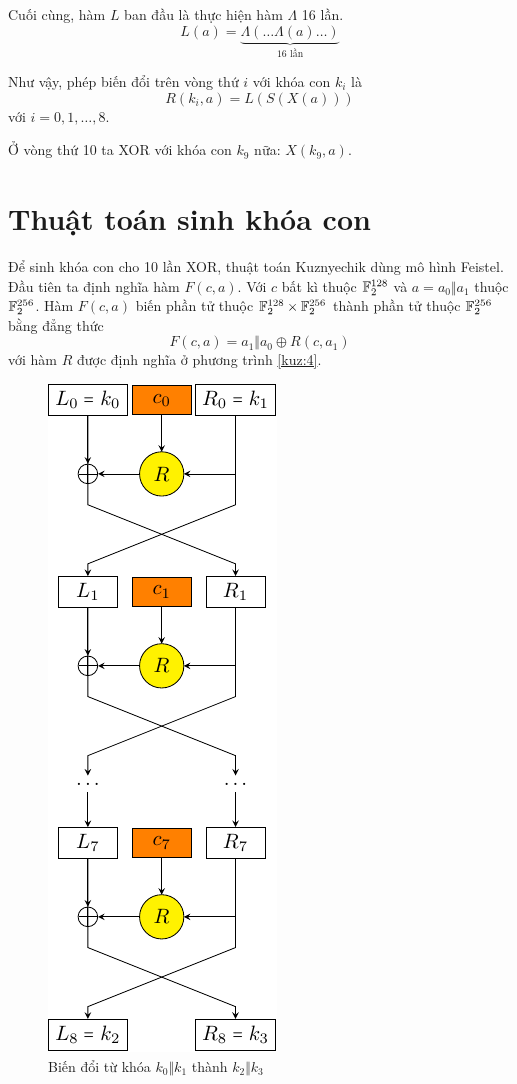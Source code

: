 Cuối cùng, hàm $L$ ban đầu là thực hiện hàm $\Lambda$ 16 lần.
\[L(a) = \underbrace{\Lambda(\ldots\Lambda(a)\ldots)}_{\text{16 lần}}\]

Như vậy, phép biến đổi trên vòng thứ $i$ với khóa con $k_i$ là
\begin{equation}\label{kuz:4}
    R(k_i, a) = L(S(X(a)))
\end{equation}
với $i = 0, 1, \ldots, 8$.

Ở vòng thứ 10 ta XOR với khóa con $k_9$ nữa: $X(k_9, a)$.

\section{Thuật toán sinh khóa con}

Để sinh khóa con cho 10 lần XOR, thuật toán Kuznyechik dùng mô hình Feistel.
Đầu tiên ta định nghĩa hàm $F(c, a)$. Với $c$ bất kì thuộc $\mathbb{F}_2^{128}$
và $a = a_0 \Vert a_1$ thuộc $\mathbb{F}_2^{256}$. Hàm $F(c, a)$ biến phần
tử thuộc $\mathbb{F}_2^{128} \times \mathbb{F}_2^{256}$ thành phần tử thuộc 
$\mathbb{F}_2^{256}$ bằng đẳng thức
\[F(c, a) = a_1 \Vert a_0 \oplus R(c, a_1)\] 
với hàm $R$ được định nghĩa ở phương trình \ref{kuz:4}.

\begin{figure}[ht]
    \centering
    \includegraphics{../pics/kuznyechik/funcF.pdf}
    \caption{Biến đổi từ khóa $k_0 \Vert k_1$ thành $k_2 \Vert k_3$}
    \label{kuzfic:2}
\end{figure}

